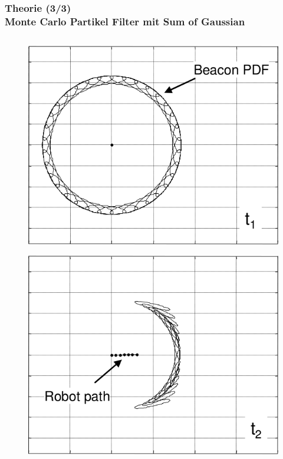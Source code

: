 \documentclass{beamer}
\begin{document}
%
%
\begin{frame}
	\frametitle{Theorie (3/3)\\\normalsize{Monte Carlo Partikel Filter mit Sum of Gaussian}}
	\begin{columns}
			\begin{overlayarea}{\textwidth}{.5\textheight}
				\only<1>
				{
					\begin{figure}
						\centering
						\includegraphics[width=\linewidth]{blanco2008efficient_fig3_1}
						\caption{\cite{blanco2008efficient}}
					\end{figure}
				}
				{
					\begin{figure}
						\centering
						\includegraphics[width=\linewidth]{blanco2008efficient_fig3_2}

\end{figure}}
\end{overlayarea}
\end{columns}
\end{frame}
\end{document}

